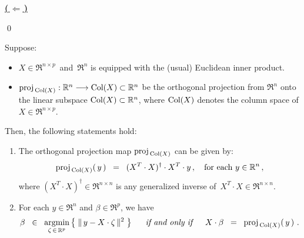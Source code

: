 \vskip 0.2cm
\noindent
\underline{\textbf{(\,$\Longleftarrow$\,)}}\quad

\qed

\begin{proposition}
\mbox{}\vskip 0.1cm\noindent
Suppose:
\begin{itemize}
\item
	$X \in \Re^{n \times p}$\, and \,$\Re^{n}$ is equipped with the (usual) Euclidean inner product.
\item
	$\textnormal{proj}_{\,\textnormal{Col}(X)} : \mathbb{R}^{n} \longrightarrow \textnormal{Col}(X) \subset \mathbb{R}^{n}$
	be the orthogonal projection from $\Re^{n}$ onto the linear subspace $\textnormal{Col}(X) \subset \mathbb{R}^{n}$,
	where $\textnormal{Col}(X)$ denotes the column space of $X \in \Re^{n \times p}$.
\end{itemize}
Then, the following statements hold:
\begin{enumerate}
\item
	The orthogonal projection map $\textnormal{proj}_{\,\textnormal{Col}(X)}$ can be given by:
	\begin{equation*}
	\textnormal{proj}_{\,\textnormal{Col}(X)}(\,y\,) \;\; = \;\; (X^{T}\cdot X)^{\dagger} \cdot X^{T} \cdot y\,,
	\quad
	\textnormal{for each $y \in \mathbb{R}^{n}$}\,,
	\end{equation*}
	where $(X^{T}\cdot X)^{\dagger} \in \Re^{n \times n}$ is any generalized inverse of
	\,$X^{T} \cdot X \in \Re^{n \times n}$.
\item
	For each $y \in \Re^{n}$ and $\beta \in \Re^{p}$, we have
	\begin{equation*}
	\beta \;\;\in\;\; \underset{\zeta\,\in\,\mathbb{R}^{p}}{\textnormal{argmin}}\left\{\;\Vert\,y - X \cdot \zeta\,\Vert^{2}\;\right\}
	\quad\;\;\textnormal{\it if and only if}\quad\;\;
	X\cdot\beta \;\; = \;\; \textnormal{proj}_{\,\textnormal{Col}(X)}\!\left(\,y\,\right)\,.
	\end{equation*}
\end{enumerate}
\end{proposition}


